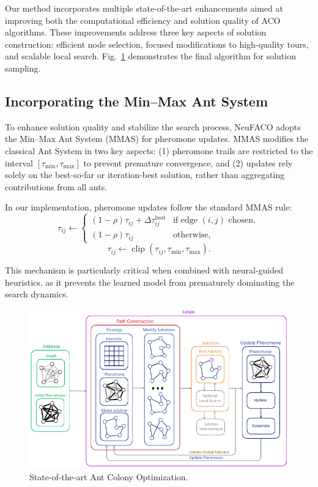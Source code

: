 \documentclass[a4paper,conference]{IEEEtran}
\begin{document}
Our method incorporates multiple state-of-the-art enhancements aimed at improving both the computational efficiency and solution quality of ACO algorithms. These improvements address three key aspects of solution construction: efficient node selection, focused modifications to high-quality tours, and scalable local search. Fig.~\ref{fig:FACO} demonstrates the final algorithm for solution sampling.

\subsection{Incorporating the Min--Max Ant System}
To enhance solution quality and stabilize the search process, NeuFACO adopts the Min--Max Ant System (MMAS) \cite{MMAS} for pheromone updates. MMAS modifies the classical Ant System in two key aspects: (1) pheromone trails are restricted to the interval $[\tau_{\min},\tau_{\max}]$ to prevent premature convergence, and (2) updates rely solely on the best-so-far or iteration-best solution, rather than aggregating contributions from all ants.

In our implementation, pheromone updates follow the standard MMAS rule:
\begin{equation}
\tau_{ij} \leftarrow \begin{cases}
(1-\rho)\tau_{ij} + \Delta\tau_{ij}^{\text{best}} & \text{if edge }(i,j) \text{ chosen},\\
(1-\rho)\tau_{ij} & \text{otherwise},
\end{cases}
\end{equation}
\begin{equation}
\tau_{ij} \leftarrow \operatorname{clip}(\tau_{ij},\tau_{\min},\tau_{\max}).
\end{equation}

This mechanism is particularly critical when combined with neural-guided heuristics, as it prevents the learned model from prematurely dominating the search dynamics.

\begin{figure}[!htb]
  \centering
  \includegraphics[width=\linewidth]{FACO.pdf}
  \caption{State-of-the-art Ant Colony Optimization.}
  \label{fig:FACO}
\end{figure}
\end{document}
